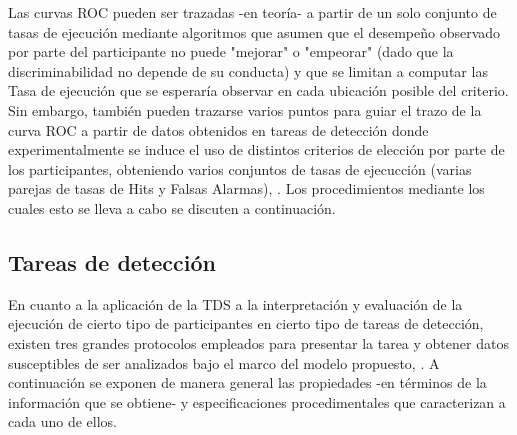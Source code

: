 Las curvas ROC pueden ser trazadas -en teoría- a partir de un solo conjunto de tasas de ejecución \parencite{Pollack1964a, Pollack1964b, McNicol2} mediante algoritmos que asumen que el desempeño observado por parte del participante no puede "mejorar" o "empeorar" (dado que la discriminabilidad no depende de su conducta) y que se limitan a computar las Tasa de ejecución que se esperaría observar en cada ubicación posible del criterio. Sin embargo, también pueden trazarse varios puntos para guiar el trazo de la curva ROC a partir de datos obtenidos en tareas de detección donde experimentalmente se induce el uso de distintos criterios de elección por parte de los participantes, obteniendo varios conjuntos de tasas de ejecucción (varias parejas de tasas de Hits y Falsas Alarmas), \parencite{Swets1961, Swets1986}. Los procedimientos mediante los cuales esto se lleva a cabo se discuten a continuación.\\


\subsection{Tareas de detección}

En cuanto a la aplicación de la TDS a la interpretación y evaluación de la ejecución de cierto tipo de participantes en cierto tipo de tareas de detección, existen tres grandes protocolos empleados para presentar la tarea y obtener datos susceptibles de ser analizados bajo el marco del modelo propuesto, \parencite{McNicol2, Stainslaw1999}. A continuación se exponen de manera general las propiedades -en términos de la información que se obtiene- y especificaciones procedimentales que caracterizan a cada uno de ellos.\\

